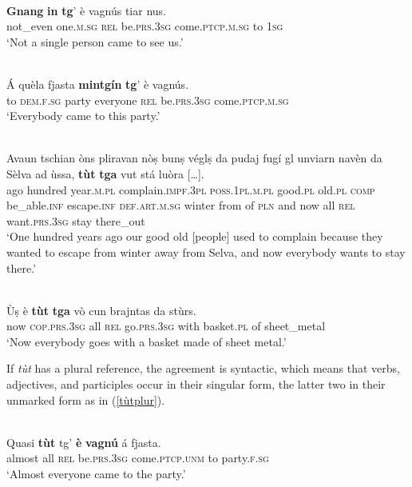 \ea

\\
\gll \textbf{Gnang} \textbf{in} \textbf{tg}' è vagnús tiar nus.\\
not\_even one.\textsc{m.sg} \textsc{rel} be.\textsc{prs.3sg} come.\textsc{ptcp.m.sg} to \textsc{1sg}\\
\glt `Not a single person came to see us.'
\z

\ea

\\
\gll Á quèla fjasta \textbf{mintgín} \textbf{tg}' è vagnús.   \\
to \textsc{dem.f.sg} party everyone \textsc{rel} be.\textsc{prs.3sg} come.\textsc{ptcp.m.sg} \\
\glt `Everybody came to this party.'
\z

\ea

\\
\gll  Avaun tschian òns pliravan nòṣ bunṣ véglṣ da pudaj fugí gl unviarn navèn da Sèlva ad ùssa, \textbf{tùt} \textbf{tga} vut stá luòra […].\\
ago hundred year.\textsc{m.pl} complain.\textsc{impf.3pl} \textsc{poss.1pl.m.pl} good.\textsc{pl} old.\textsc{pl} \textsc{comp} be\_able.\textsc{inf} escape.\textsc{inf} \textsc{def.art.m.sg} winter from of \textsc{pln} and now all \textsc{rel} want.\textsc{prs.3sg} stay there\_out \\
\glt `One hundred years ago our good old [people] used to complain because they wanted to escape from winter away from Selva, and now everybody wants to stay there.'
\z

\ea

\\
\gll  Ùṣ è \textbf{tùt} \textbf{tga} vò cun brajntas da stùrs.\\
now \textsc{cop.prs.3sg} all \textsc{rel} go.\textsc{prs.3sg} with basket.\textsc{pl} of sheet\_metal\\
\glt `Now everybody goes with a basket made of sheet metal.'
\z

If \textit{tùt} has a plural reference, the agreement is syntactic, which means that verbs, adjectives, and participles occur in their singular form, the latter two in their unmarked form as in (\ref{tùtplur}).

\ea\label{tùtplur}
\\
\gll  Quasi \textbf{tùt} tg' \textbf{è} \textbf{vagnú} á fjasta.\\
almost all \textsc{rel} be.\textsc{prs.3sg} come.\textsc{ptcp.unm} to party.\textsc{f.sg}\\
\glt `Almost everyone came to the party.'
\z


